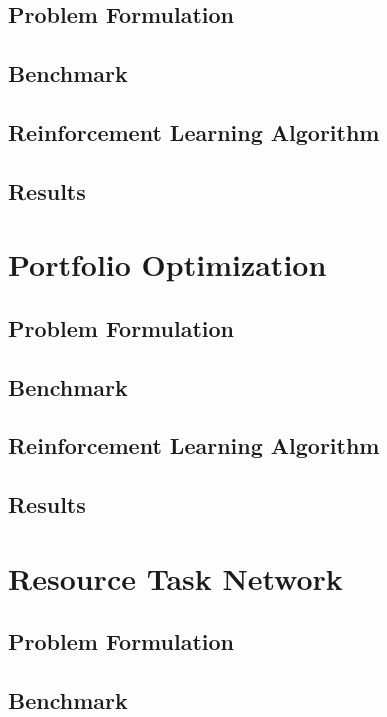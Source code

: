 \documentclass[12pt]{article}
\begin{document}
\subsection{Problem Formulation}

\subsection{Benchmark}

\subsection{Reinforcement Learning Algorithm}

\subsection{Results}

\section{Portfolio Optimization}

\subsection{Problem Formulation}

\subsection{Benchmark}

\subsection{Reinforcement Learning Algorithm}

\subsection{Results}

\section{Resource Task Network}

\subsection{Problem Formulation}

\subsection{Benchmark}
\end{document}
